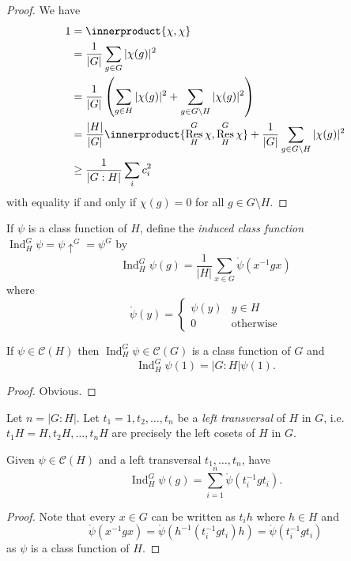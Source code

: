 \documentclass[a4paper]{article}
\newcommand*{\ip}{\innerproduct} %
\DeclareMathOperator{\Res}{Res} %
\DeclareMathOperator{\Ind}{Ind} %
\theoremstyle{definition}
\begin{document}
\begin{proof}
  We have
  \begin{align*}
    1
    &= \ip{\chi, \chi} \\
    &= \frac{1}{|G|} \sum_{g \in G} |\chi(g)|^2 \\
    &= \frac{1}{|G|} \left(\sum_{g \in H} |\chi(g)|^2 + \sum_{g \in G \setminus H} |\chi(g)|^2 \right) \\
    &= \frac{|H|}{|G|} \ip{\Res_H^G \chi, \Res_H^G \chi} + \frac{1}{|G|} \sum_{g \in G \setminus H} |\chi(g)|^2 \\
    &\geq \frac{1}{|G:H|} \sum_i c_i^2
  \end{align*}
  with equality if and only if \(\chi(g) = 0\) for all \(g \in G \setminus H\).
\end{proof}

\begin{definition}[induction]
  If \(\psi\) is a class function of \(H\), define the \emph{induced class function} \(\Ind_H^G \psi = \psi \uparrow^G = \psi^G\) by
  \[
    \Ind_H^G \psi (g) = \frac{1}{|H|} \sum_{x \in G} \ocirc \psi(x^{-1} gx)
  \]
  where
  \[
    \ocirc \psi(y) =
    \begin{cases}
      \psi(y) & y \in H \\
      0 & \text{otherwise}
    \end{cases}
  \]
\end{definition}

\begin{lemma}
  If \(\psi \in \mathcal C(H)\) then \(\Ind_H^G \psi \in \mathcal C(G)\) is a class function of \(G\) and
  \[
    \Ind_H^G \psi(1) = |G:H| \psi(1).
  \]
\end{lemma}

\begin{proof}
  Obvious.
\end{proof}

Let \(n = |G:H|\). Let \(t_1 = 1, t_2, \dots, t_n\) be a \emph{left transversal} of \(H\) in \(G\), i.e.\ \(t_1H = H, t_2H, \dots, t_nH\) are precisely the left cosets of \(H\) in \(G\).

\begin{lemma}
  Given \(\psi \in \mathcal C(H)\) and a left transversal \(t_1, \dots, t_n\), have
  \[
    \Ind_H^G \psi(g) = \sum_{i = 1}^n \ocirc \psi(t_i^{-1} g t_i).
  \]
\end{lemma}

\begin{proof}
  Note that every \(x \in G\) can be written as \(t_i h\) where \(h \in H\) and
  \[
    \ocirc \psi(x^{-1} g x)
    = \ocirc \psi(h^{-1}(t_i^{-1} g t_i) h)
    = \ocirc \psi(t_i^{-1} gt_i)
  \]
  as \(\psi\) is a class function of \(H\).
\end{proof}
\end{document}
